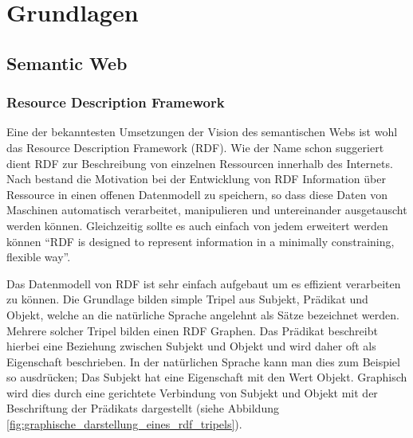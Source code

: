 

\chapter{Grundlagen} %
\label{cha:grundlagen}

\section{Semantic Web} %
\label{sec:semantic_web}


\subsection{Resource Description Framework} %
\label{sub:resource_description_language}

Eine der bekanntesten Umsetzungen der Vision des  semantischen Webs ist wohl das Resource Description Framework (RDF). Wie der Name schon suggeriert dient RDF zur Beschreibung von einzelnen Ressourcen innerhalb des Internets. Nach \cite{Klyne2004,Manola2004} bestand die Motivation bei der Entwicklung von RDF Information über Ressource in einen offenen Datenmodell zu speichern, so dass diese Daten von Maschinen automatisch verarbeitet, manipulieren und untereinander ausgetauscht werden können. Gleichzeitig sollte es auch einfach von jedem erweitert werden können \enquote{RDF is designed to represent information in a minimally constraining, flexible way}\cite{Klyne2004}.

\medskip

Das Datenmodell von RDF ist sehr einfach aufgebaut um es effizient verarbeiten zu können. Die Grundlage bilden simple Tripel aus Subjekt, Prädikat und Objekt, welche an die natürliche Sprache angelehnt als Sätze\cite{Heinzen} bezeichnet werden. Mehrere solcher Tripel bilden einen RDF Graphen. Das Prädikat beschreibt hierbei eine Beziehung zwischen Subjekt und Objekt und wird daher oft als Eigenschaft beschrieben. In der natürlichen Sprache kann man dies zum Beispiel so ausdrücken; Das Subjekt hat eine Eigenschaft mit den Wert Objekt. Graphisch wird dies durch eine gerichtete Verbindung von Subjekt und Objekt mit der Beschriftung der Prädikats dargestellt (siehe Abbildung \ref{fig:graphische_darstellung_eines_rdf_tripels}).

\medskip

